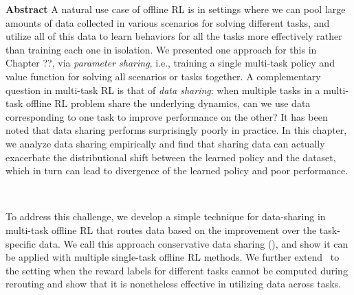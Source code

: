 \documentclass[../thesis.tex]{subfiles}
\begin{document}

\vspace{-0.4cm}
\begin{AIbox}{\large{\textbf{Abstract}}}
\vspace{4mm}
A natural use case of offline RL is in settings where we can pool large amounts of data collected in various scenarios for solving different tasks, and utilize all of this data to learn behaviors for all the tasks more effectively rather than training each one in isolation. We presented one approach for this in Chapter ??, via \emph{parameter sharing}, i.e., training a single multi-task policy and value function for solving all scenarios or tasks together. A complementary question in multi-task RL is that of \emph{data sharing}: when multiple tasks in a multi-task offline RL problem share the underlying dynamics, can we use data corresponding to one task to improve performance on the other? It has been noted that data sharing performs surprisingly poorly in practice. In this chapter, we analyze data sharing empirically and find that sharing data can actually exacerbate the distributional shift between the learned policy and the dataset, which in turn can lead to divergence of the learned policy and poor performance.

~

To address this challenge, we develop a simple technique for data-sharing in multi-task offline RL that routes data based on the improvement over the task-specific data. We call this approach conservative data sharing (\cdsmethodname), and show it can be applied with multiple single-task offline RL methods. We further extend \cdsmethodname\ to the setting when the reward labels for different tasks cannot be computed during rerouting and show that it is nonetheless effective in utilizing data across tasks. 
\vspace{2mm}
\end{AIbox}
\end{document}

